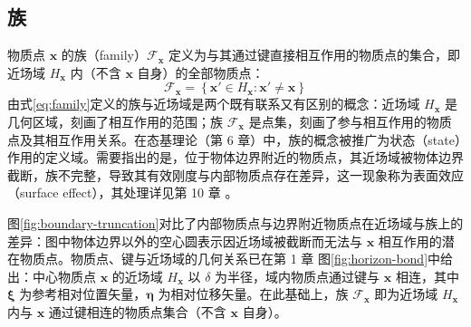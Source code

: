 \subsection{族}

物质点 $\mathbf{x}$ 的族（family）$\mathcal{F}_{\mathbf{x}}$ 定义为与其通过键直接相互作用的物质点的集合，即近场域 $H_{\mathbf{x}}$ 内（不含 $\mathbf{x}$ 自身）的全部物质点：
\begin{equation}
  \mathcal{F}_{\mathbf{x}}=\left\{\mathbf{x}'\in H_{\mathbf{x}}:\mathbf{x}'\neq\mathbf{x}\right\}
  \label{eq:family}
\end{equation}
由式\eqref{eq:family}定义的族与近场域是两个既有联系又有区别的概念：近场域 $H_{\mathbf{x}}$ 是几何区域，刻画了相互作用的范围；族 $\mathcal{F}_{\mathbf{x}}$ 是点集，刻画了参与相互作用的物质点及其相互作用关系。在态基理论（第 6 章）中，族的概念被推广为状态（state）作用的定义域。需要指出的是，位于物体边界附近的物质点，其近场域被物体边界截断，族不完整，导致其有效刚度与内部物质点存在差异，这一现象称为表面效应（surface effect），其处理详见第 10 章 \cite{LeBobaru2018,Mitchell2015}。

图\ref{fig:boundary-truncation}对比了内部物质点与边界附近物质点在近场域与族上的差异：图中物体边界以外的空心圆表示因近场域被截断而无法与 $\mathbf{x}$ 相互作用的潜在物质点。物质点、键与近场域的几何关系已在第 1 章 图\ref{fig:horizon-bond}中给出：中心物质点 $\mathbf{x}$ 的近场域 $H_{\mathbf{x}}$ 以 $\delta$ 为半径，域内物质点通过键与 $\mathbf{x}$ 相连，其中 $\boldsymbol{\xi}$ 为参考相对位置矢量，$\boldsymbol{\eta}$ 为相对位移矢量。在此基础上，族 $\mathcal{F}_{\mathbf{x}}$ 即为近场域 $H_{\mathbf{x}}$ 内与 $\mathbf{x}$ 通过键相连的物质点集合（不含 $\mathbf{x}$ 自身）。

